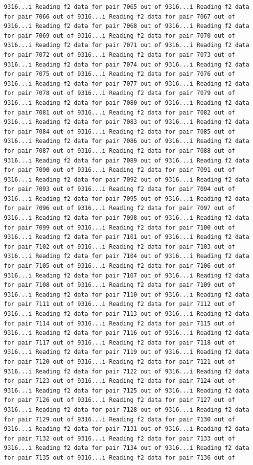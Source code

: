 \documentclass[
]{article}
\begin{document}
\begin{verbatim}
9316...i Reading f2 data for pair 7065 out of 9316...i Reading f2 data for pair 7066 out of 9316...i Reading f2 data for pair 7067 out of 9316...i Reading f2 data for pair 7068 out of 9316...i Reading f2 data for pair 7069 out of 9316...i Reading f2 data for pair 7070 out of 9316...i Reading f2 data for pair 7071 out of 9316...i Reading f2 data for pair 7072 out of 9316...i Reading f2 data for pair 7073 out of 9316...i Reading f2 data for pair 7074 out of 9316...i Reading f2 data for pair 7075 out of 9316...i Reading f2 data for pair 7076 out of 9316...i Reading f2 data for pair 7077 out of 9316...i Reading f2 data for pair 7078 out of 9316...i Reading f2 data for pair 7079 out of 9316...i Reading f2 data for pair 7080 out of 9316...i Reading f2 data for pair 7081 out of 9316...i Reading f2 data for pair 7082 out of 9316...i Reading f2 data for pair 7083 out of 9316...i Reading f2 data for pair 7084 out of 9316...i Reading f2 data for pair 7085 out of 9316...i Reading f2 data for pair 7086 out of 9316...i Reading f2 data for pair 7087 out of 9316...i Reading f2 data for pair 7088 out of 9316...i Reading f2 data for pair 7089 out of 9316...i Reading f2 data for pair 7090 out of 9316...i Reading f2 data for pair 7091 out of 9316...i Reading f2 data for pair 7092 out of 9316...i Reading f2 data for pair 7093 out of 9316...i Reading f2 data for pair 7094 out of 9316...i Reading f2 data for pair 7095 out of 9316...i Reading f2 data for pair 7096 out of 9316...i Reading f2 data for pair 7097 out of 9316...i Reading f2 data for pair 7098 out of 9316...i Reading f2 data for pair 7099 out of 9316...i Reading f2 data for pair 7100 out of 9316...i Reading f2 data for pair 7101 out of 9316...i Reading f2 data for pair 7102 out of 9316...i Reading f2 data for pair 7103 out of 9316...i Reading f2 data for pair 7104 out of 9316...i Reading f2 data for pair 7105 out of 9316...i Reading f2 data for pair 7106 out of 9316...i Reading f2 data for pair 7107 out of 9316...i Reading f2 data for pair 7108 out of 9316...i Reading f2 data for pair 7109 out of 9316...i Reading f2 data for pair 7110 out of 9316...i Reading f2 data for pair 7111 out of 9316...i Reading f2 data for pair 7112 out of 9316...i Reading f2 data for pair 7113 out of 9316...i Reading f2 data for pair 7114 out of 9316...i Reading f2 data for pair 7115 out of 9316...i Reading f2 data for pair 7116 out of 9316...i Reading f2 data for pair 7117 out of 9316...i Reading f2 data for pair 7118 out of 9316...i Reading f2 data for pair 7119 out of 9316...i Reading f2 data for pair 7120 out of 9316...i Reading f2 data for pair 7121 out of 9316...i Reading f2 data for pair 7122 out of 9316...i Reading f2 data for pair 7123 out of 9316...i Reading f2 data for pair 7124 out of 9316...i Reading f2 data for pair 7125 out of 9316...i Reading f2 data for pair 7126 out of 9316...i Reading f2 data for pair 7127 out of 9316...i Reading f2 data for pair 7128 out of 9316...i Reading f2 data for pair 7129 out of 9316...i Reading f2 data for pair 7130 out of 9316...i Reading f2 data for pair 7131 out of 9316...i Reading f2 data for pair 7132 out of 9316...i Reading f2 data for pair 7133 out of 9316...i Reading f2 data for pair 7134 out of 9316...i Reading f2 data for pair 7135 out of 9316...i Reading f2 data for pair 7136 out of 
\end{verbatim}
\end{document}

